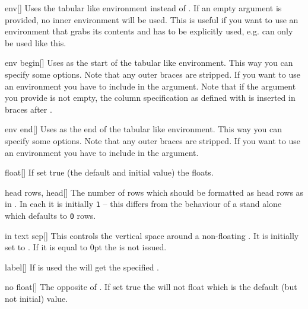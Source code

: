\begin{describeopt}{env}[]%
  Uses the tabular like environment  instead of . If
  an empty argument is provided, no inner environment will be used. This is
  useful if you want to use an environment that grabs its contents and has to be
  explicitly used, e.g.  can only be used like this.
\end{describeopt}%
\begin{describeopt}{env begin}[]%
  Uses  as the start of the tabular like environment. This way you
  can specify some options. Note that any outer braces are stripped. If you want
  to use an environment you have to include  in the argument. Note
  that if the argument you provide is not empty, the column specification as
  defined with  is inserted in braces after .
\end{describeopt}%
\begin{describeopt}{env end}[]%
  Uses  as the end of the tabular like environment. This way you can
  specify some options. Note that any outer braces are stripped. If you want to
  use an environment you have to include  in the argument.
\end{describeopt}%
\begin{describeopt}{float}[]%
  If set true (the default and initial value) the  floats.
\end{describeopt}%
\begin{describeopt}{head rows, head}[]%
  The number of rows which should be formatted as head rows as in
  . In each  it is initially \texttt{1} -- this
  differs from the behaviour of a stand alone  which defaults to
  \texttt{0} rows.
\end{describeopt}%
\begin{describeopt}{in text sep}[]%
  This controls the vertical space around a non-floating . It is
  initially set to . If it is equal to 0pt the  is not
  issued.
\end{describeopt}%
\begin{describeopt}{label}[]%
  If  is used the  will get the specified
  .
\end{describeopt}%
\begin{describeopt}{no float}[]%
  The opposite of . If set true the  will not float
  which is the default (but not initial) value.
\end{describeopt}%
